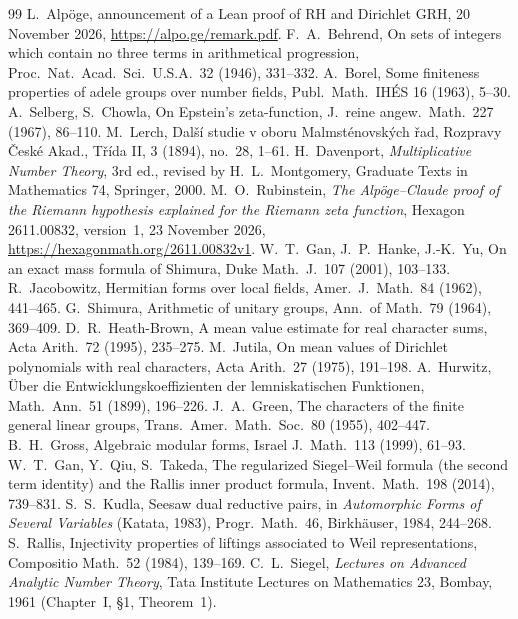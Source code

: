 \documentclass[11pt]{amsart}
\numberwithin{equation}{section}
\theoremstyle{definition}
\theoremstyle{remark}
\begin{document}
\begin{thebibliography}{99}\small
{} L.~Alp\"oge, announcement of a Lean proof of RH and Dirichlet GRH, 20 November 2026, \url{https://alpo.ge/remark.pdf}.
 F.~A.~Behrend, On sets of integers which contain no three terms in arithmetical progression, Proc.\ Nat.\ Acad.\ Sci.\ U.S.A.\ 32 (1946), 331--332.
 A.~Borel, Some finiteness properties of adele groups over number fields, Publ.\ Math.\ IH\'ES 16 (1963), 5--30.
 A.~Selberg, S.~Chowla, On Epstein's zeta-function, J.\ reine angew.\ Math.\ 227 (1967), 86--110.
 M.~Lerch, Dal\v{s}\'i studie v oboru Malmst\'enovsk\'ych \v{r}ad, Rozpravy \v{C}esk\'e Akad., T\v{r}\'ida II, 3 (1894), no.~28, 1--61.
 H.~Davenport, \emph{Multiplicative Number Theory}, 3rd ed., revised by H.~L.~Montgomery, Graduate Texts in Mathematics 74, Springer, 2000.
 M.~O.~Rubinstein, \emph{The Alp\"oge--Claude proof of the Riemann hypothesis explained for the Riemann zeta function}, Hexagon 2611.00832, version~1, 23 November 2026, \url{https://hexagonmath.org/2611.00832v1}.
 W.~T.~Gan, J.~P.~Hanke, J.-K.~Yu, On an exact mass formula of Shimura, Duke Math.\ J.\ 107 (2001), 103--133.
 R.~Jacobowitz, Hermitian forms over local fields, Amer.\ J.\ Math.\ 84 (1962), 441--465.
 G.~Shimura, Arithmetic of unitary groups, Ann.\ of Math.\ 79 (1964), 369--409.
 D.~R.~Heath-Brown, A mean value estimate for real character sums, Acta Arith.\ 72 (1995), 235--275.
 M.~Jutila, On mean values of Dirichlet polynomials with real characters, Acta Arith.\ 27 (1975), 191--198.
 A.~Hurwitz, \"Uber die Entwicklungskoeffizienten der lemniskatischen Funktionen, Math.\ Ann.\ 51 (1899), 196--226.
 J.~A.~Green, The characters of the finite general linear groups, Trans.\ Amer.\ Math.\ Soc.\ 80 (1955), 402--447.
 B.~H.~Gross, Algebraic modular forms, Israel J.\ Math.\ 113 (1999), 61--93.
 W.~T.~Gan, Y.~Qiu, S.~Takeda, The regularized Siegel--Weil formula (the second term identity) and the Rallis inner product formula, Invent.\ Math.\ 198 (2014), 739--831.
 S.~S.~Kudla, Seesaw dual reductive pairs, in \emph{Automorphic Forms of Several Variables} (Katata, 1983), Progr.\ Math.\ 46, Birkh\"auser, 1984, 244--268.
 S.~Rallis, Injectivity properties of liftings associated to Weil representations, Compositio Math.\ 52 (1984), 139--169.
 C.~L.~Siegel, \emph{Lectures on Advanced Analytic Number Theory}, Tata Institute Lectures on Mathematics 23, Bombay, 1961 (Chapter~I, \S1, Theorem~1).

\end{thebibliography}
\end{document}
